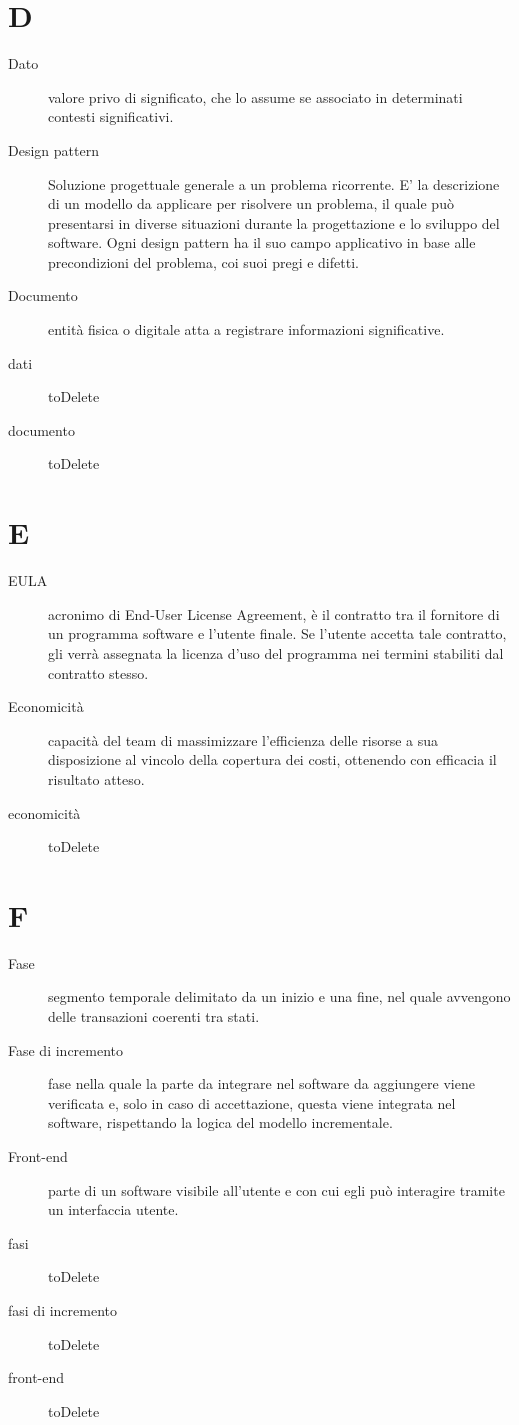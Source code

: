 \documentclass{article}
\begin{document}
  \section{D}
  \begin{description}
    \item[Dato] valore privo di significato, che lo assume se associato in determinati contesti significativi.
    \item[Design pattern] Soluzione progettuale generale a un problema ricorrente. E' la descrizione di un modello da applicare per risolvere un problema, il quale può presentarsi in diverse situazioni durante la progettazione e lo sviluppo del software. Ogni design pattern ha il suo campo applicativo in base alle precondizioni del problema, coi suoi pregi e difetti.
    \item[Documento] entità fisica o digitale atta a registrare informazioni significative.
    \item[dati] toDelete
    \item[documento] toDelete
	\end{description}
  \section{E}
  \begin{description}
    \item[EULA] acronimo di End-User License Agreement, è il contratto tra il fornitore di un programma software e l'utente finale. Se l'utente accetta tale contratto, gli verrà assegnata la licenza d'uso del programma nei termini stabiliti dal contratto stesso.
    \item[Economicità] capacità del team di massimizzare l’efficienza delle risorse a sua disposizione al vincolo della copertura dei costi, ottenendo con efficacia il risultato atteso.
    \item[economicità] toDelete
	\end{description}
  \section{F}
  \begin{description}
    \item[Fase] segmento temporale delimitato da un inizio e una fine, nel quale avvengono delle transazioni coerenti tra stati.
    \item[Fase di incremento] fase nella quale la parte da integrare nel software da aggiungere viene verificata e, solo in caso di accettazione, questa viene integrata nel software, rispettando la logica del modello incrementale.
    \item[Front-end] parte di un software visibile all'utente e con cui egli può interagire tramite un interfaccia utente.
    \item[fasi] toDelete
    \item[fasi di incremento] toDelete
    \item[front-end] toDelete
	\end{description}
\end{document}
